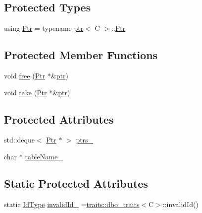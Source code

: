 \subsection*{Protected Types}
\begin{DoxyCompactItemize}
\item 
using \hyperlink{classdbo_1_1collection_a5d509fade7beb175d427ffca3dc9559f}{Ptr} = typename \hyperlink{classdbo_1_1ptr}{ptr}$<$ C $>$\+::\hyperlink{classdbo_1_1collection_a5d509fade7beb175d427ffca3dc9559f}{Ptr}
\end{DoxyCompactItemize}
\subsection*{Protected Member Functions}
\begin{DoxyCompactItemize}
\item 
void \hyperlink{classdbo_1_1collection_ab6fd1148b56a8370eb9a354f0c19f99f}{free} (\hyperlink{classdbo_1_1collection_a5d509fade7beb175d427ffca3dc9559f}{Ptr} $\ast$\&\hyperlink{classdbo_1_1ptr}{ptr})
\item 
void \hyperlink{classdbo_1_1collection_a5d1235d48ba1a6c0abb28a86050cce78}{take} (\hyperlink{classdbo_1_1collection_a5d509fade7beb175d427ffca3dc9559f}{Ptr} $\ast$\&\hyperlink{classdbo_1_1ptr}{ptr})
\end{DoxyCompactItemize}
\subsection*{Protected Attributes}
\begin{DoxyCompactItemize}
\item 
std\+::deque$<$ \hyperlink{classdbo_1_1collection_a5d509fade7beb175d427ffca3dc9559f}{Ptr} $\ast$ $>$ \hyperlink{classdbo_1_1collection_a868d7d3bfb98c3a4f739e48043aeaba3}{ptrs\+\_\+}
\item 
char $\ast$ \hyperlink{classdbo_1_1collection_a8b18a6670d28cfc6e6ace16ce62c2609}{table\+Name\+\_\+}
\end{DoxyCompactItemize}
\subsection*{Static Protected Attributes}
\begin{DoxyCompactItemize}
\item 
static \hyperlink{classdbo_1_1collection_ad004dc216c503f08d75c1d3e3fffe803}{Id\+Type} \hyperlink{classdbo_1_1collection_af3537bd847de5995e84cf83649276001}{invalid\+Id\+\_\+} =\hyperlink{structdbo_1_1traits_1_1dbo__traits}{traits\+::dbo\+\_\+traits}$<$C$>$\+::invalid\+Id()
\end{DoxyCompactItemize}


